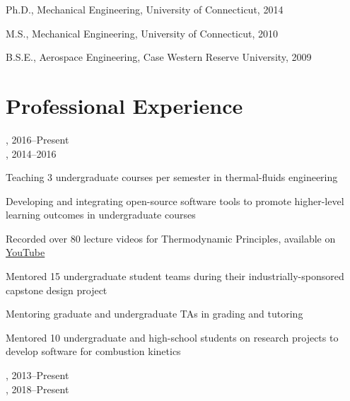 Ph.D., Mechanical Engineering, University of Connecticut, 2014

M.S., Mechanical Engineering, University of Connecticut, 2010

B.S.E., Aerospace Engineering, Case Western Reserve University, 2009

\section{{\sectionfont{} Professional Experience}}

,  \hfill 2016--Present\\
,  \hfill 2014--2016

\begin{innerlist}
    \item Teaching 3 undergraduate courses per semester in thermal-fluids engineering
    \item Developing and integrating open-source software tools to promote higher-level learning outcomes in undergraduate courses
    \item Recorded over 80 lecture videos for Thermodynamic Principles, available on \href{https://www.youtube.com/playlist?list=PLnOxmF4n89SXsKxFb6ug0ThMNpqJST5_X}{YouTube}
    \item Mentored 15 undergraduate student teams during their industrially-sponsored capstone design project
    \item Mentoring graduate and undergraduate TAs in grading and tutoring
    \item Mentored 10 undergraduate and high-school students on research projects to develop software for combustion kinetics
\end{innerlist}

\vspace{\baselineskip}

,  \hfill 2013--Present\\
,  \hfill 2018--Present

